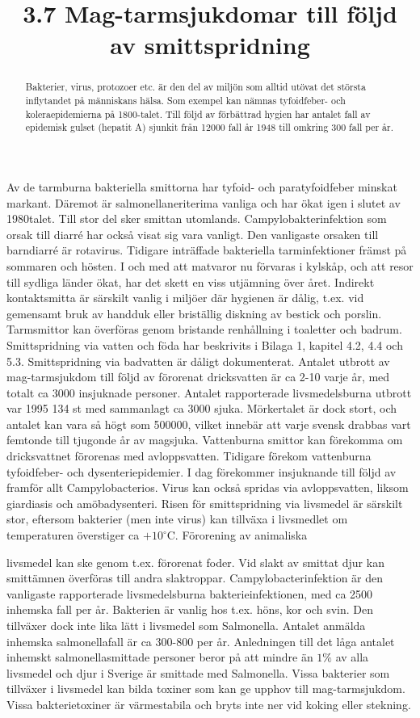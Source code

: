 \title{
3.7 Mag-tarmsjukdomar till följd av smittspridning
}
\begin{abstract}
Bakterier, virus, protozoer etc. är den del av miljön som alltid utövat det största inflytandet på människans hälsa. Som exempel kan nämnas tyfoidfeber- och koleraepidemierna på 1800-talet. Till följd av förbättrad hygien har antalet fall av epidemisk gulset (hepatit A) sjunkit från 12000 fall år 1948 till omkring 300 fall per år.
\end{abstract}
Av de tarmburna bakteriella smittorna har tyfoid- och paratyfoidfeber minskat markant. Däremot är salmonellaneriterima vanliga och har ökat igen i slutet av 1980talet. Till stor del sker smittan utomlands. Campylobakterinfektion som orsak till diarré har också visat sig vara vanligt. Den vanligaste orsaken till barndiarré är rotavirus.
Tidigare inträffade bakteriella tarminfektioner främst på sommaren och hösten. I och med att matvaror nu förvaras i kylskåp, och att resor till sydliga länder ökat, har det skett en viss utjämning över året. Indirekt kontaktsmitta är särskilt vanlig i miljöer där hygienen är dålig, t.ex. vid gemensamt bruk av handduk eller briställig diskning av bestick och porslin. Tarmsmittor kan överföras genom bristande renhållning i toaletter och badrum.
Smittspridning via vatten och föda har beskrivits i Bilaga 1, kapitel 4.2, 4.4 och 5.3. Smittspridning via badvatten är dåligt dokumenterat. Antalet utbrott av mag-tarmsjukdom till följd av förorenat dricksvatten är ca 2-10 varje år, med totalt ca 3000 insjuknade personer. Antalet rapporterade livsmedelsburna utbrott var 1995 134 st med sammanlagt ca 3000 sjuka. Mörkertalet är dock stort, och antalet kan vara så högt som 500000, vilket innebär att varje svensk drabbas vart femtonde till tjugonde år av magsjuka.
Vattenburna smittor kan förekomma om dricksvattnet förorenas med avloppsvatten. Tidigare förekom vattenburna tyfoidfeber- och dysenteriepidemier. I dag förekommer insjuknande till följd av framför allt Campylobacterios. Virus kan också spridas via avloppsvatten, liksom giardiasis och amöbadysenteri.
Risen för smittspridning via livsmedel är särskilt stor, eftersom bakterier (men inte virus) kan tillväxa i livsmedlet om temperaturen överstiger ca \(+10^{\circ} \mathrm{C}\). Förorening av animaliska

livsmedel kan ske genom t.ex. förorenat foder. Vid slakt av smittat djur kan smittämnen överföras till andra slaktroppar. Campylobacterinfektion är den vanligaste rapporterade livsmedelsburna bakterieinfektionen, med ca 2500 inhemska fall per år. Bakterien är vanlig hos t.ex. höns, kor och svin. Den tillväxer dock inte lika lätt i livsmedel som Salmonella.
Antalet anmälda inhemska salmonellafall är ca 300-800 per år. Anledningen till det låga antalet inhemskt salmonellasmittade personer beror på att mindre än \(1 \%\) av alla livsmedel och djur i Sverige är smittade med Salmonella.
Vissa bakterier som tillväxer i livsmedel kan bilda toxiner som kan ge upphov till mag-tarmsjukdom. Vissa bakterietoxiner är värmestabila och bryts inte ner vid koking eller stekning.

